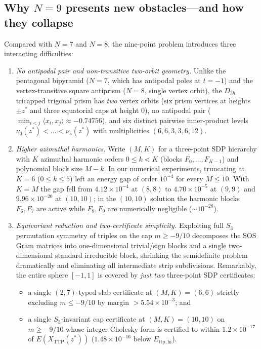 \documentclass[11pt,reqno]{amsart}
\renewcommand{\_}{\origunderscore\allowbreak}
\theoremstyle{definition}
\newcommand{\ip}[2]{\langle #1, #2 \rangle}
\newcommand{\TTP}{X_{\mathrm{TTP}}}
\newcommand{\Ettphi}{E_{\mathrm{ttp,hi}}}
\begin{document}
\subsection{Why $N = 9$ presents new obstacles---and how they collapse}\label{subsec:obstacles}
Compared with $N = 7$ and $N = 8$, the nine-point problem introduces three interacting difficulties:
\begin{enumerate}[leftmargin=2.2em]
  \item \emph{No antipodal pair and non-transitive two-orbit geometry.} Unlike the pentagonal bipyramid ($N=7$, which has antipodal poles at $t=-1$) and the vertex-transitive square antiprism ($N=8$, single vertex orbit), the $D_{3h}$ tricapped trigonal prism has \emph{two} vertex orbits (six prism vertices at heights $\pm z^*$ and three equatorial caps at height $0$), no antipodal pair ($\min_{i<j}\ip{x_i}{x_j} \approx -0.74756$), and six distinct pairwise inner-product levels $\nu_0(z^*) < \dots < \nu_5(z^*)$ with multiplicities $(6,6,3,3,6,12)$.
  \item \emph{Higher azimuthal harmonics.} Write $(M,K)$ for a three-point SDP hierarchy with $K$ azimuthal harmonic orders $0 \le k < K$ (blocks $F_0,\dots,F_{K-1}$) and polynomial block size $M-k$. In our numerical experiments, truncating at $K = 6$ ($0 \le k \le 5$) left an energy gap of order $10^{-4}$ for every $M \le 10$. With $K = M$ the gap fell from $4.12 \times 10^{-4}$ at $(8,8)$ to $4.70 \times 10^{-5}$ at $(9,9)$ and $9.96 \times 10^{-20}$ at $(10,10)$; in the $(10,10)$ solution the harmonic blocks $F_6, F_7$ are active while $F_8, F_9$ are numerically negligible ($\sim 10^{-28}$).
  \item \emph{Equivariant reduction and two-certificate simplicity.} Exploiting full $S_3$ permutation symmetry of triples on the cap $m \ge -9/10$ decomposes the SOS Gram matrices into one-dimensional trivial/sign blocks and a single two-dimensional standard irreducible block, shrinking the semidefinite problem dramatically and eliminating all intermediate strip subdivisions. Remarkably, the entire sphere $[-1,1]$ is covered by \emph{just two} three-point SDP certificates:
  \begin{itemize}[leftmargin=1.5em]
    \item a single $(2,7)$-typed slab certificate at $(M,K)=(6,6)$ strictly excluding $m \le -9/10$ by margin $> 5.54 \times 10^{-3}$; and
    \item a single $S_3$-invariant cap certificate at $(M,K)=(10,10)$ on $m \ge -9/10$ whose integer Cholesky form is certified to within $1.2 \times 10^{-17}$ of $E(\TTP(z^*))$ ($1.48 \times 10^{-16}$ below $\Ettphi$).
  \end{itemize}
\end{enumerate}
\end{document}
